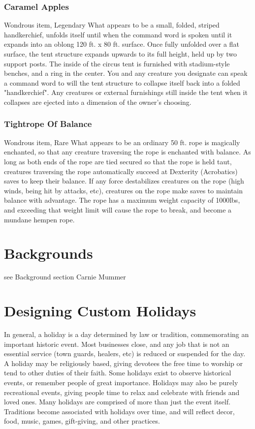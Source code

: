 \documentclass[10pt,a4paper,twoside,twocolumn,openany,bg=print,nodeprecatedcode]{dndbook}
\begin{document}
\subsection{Caramel Apples}
Wondrous item, Legendary
What appears to be a small, folded, striped handkerchief, unfolds itself until when the command word is spoken until it expands into an oblong 120 ft. x 80 ft. surface. Once fully unfolded over a flat surface, the tent structure expands upwards to its full height, held up by two support posts. The inside of the circus tent is furnished with stadium-style benches, and a ring in the center. You and any creature you designate can speak a command word to will the tent structure to collapse itself back into a folded "handkerchief". Any creatures or external furnishings still inside the tent when it collapses are ejected into a dimension of the owner's choosing.
\subsection{Tightrope Of Balance}
Wondrous item, Rare
What appears to be an ordinary 50 ft. rope is magically enchanted, so that any creature traversing the rope is enchanted with balance. As long as both ends of the rope are tied secured so that the rope is held taut, creatures traversing the rope automatically succeed at Dexterity (Acrobatics) saves to keep their balance. If any force destabilizes creatures on the rope (high winds, being hit by attacks, etc), creatures on the rope make saves to maintain balance with advantage. The rope has a maximum weight capacity of 1000lbs, and exceeding that weight limit will cause the rope to break, and become a mundane hempen rope.
\chapter{Backgrounds}
see Background section
Carnie
Mummer
\chapter{Designing Custom Holidays}
In general, a holiday is a day determined by law or tradition, commemorating an important historic event. Most businesses close, and any job that is not an essential service (town guards, healers, etc) is reduced or suspended for the day. A holiday may be religiously based, giving devotees the free time to worship or tend to other duties of their faith. Some holidays exist to observe historical events, or remember people of great importance. Holidays may also be purely recreational events, giving people time to relax and celebrate with friends and loved ones.
Many holidays are comprised of more than just the event itself. Traditions become associated with holidays over time, and will reflect decor, food, music, games, gift-giving, and other practices.
\end{document}
